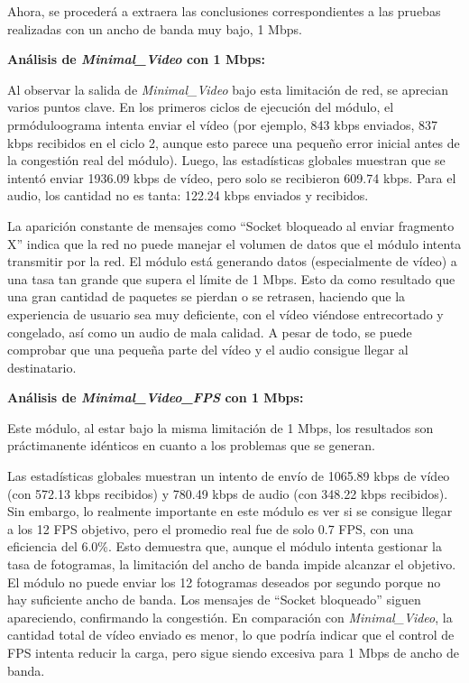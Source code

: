 \newpage

Ahora, se procederá a extraera las conclusiones correspondientes a las pruebas realizadas con un ancho de banda muy bajo, 1 Mbps.

\vspace{\baselineskip}

\textbf{Análisis de \textit{Minimal\_Video} con 1 Mbps:}
\vspace{\baselineskip}

Al observar la salida de \textit{Minimal\_Video} bajo esta limitación de red, se aprecian varios puntos clave. En los primeros ciclos de ejecución del módulo, el prmóduloograma intenta enviar el vídeo (por ejemplo, 843 kbps enviados, 837 kbps recibidos en el ciclo 2, aunque esto parece una pequeño error inicial antes de la congestión real del módulo). Luego, las estadísticas globales muestran que se intentó enviar 1936.09 kbps de vídeo, pero solo se recibieron 609.74 kbps. Para el audio, los cantidad no es tanta: 122.24 kbps enviados y recibidos.
\vspace{\baselineskip}

La aparición constante de mensajes como ``Socket bloqueado al enviar fragmento X'' indica que la red no puede manejar el volumen de datos que el módulo intenta transmitir por la red. El módulo está generando datos (especialmente de vídeo) a una tasa tan grande que supera el límite de 1 Mbps. Esto da como resultado que una gran cantidad de paquetes se pierdan o se retrasen, haciendo que la experiencia de usuario sea muy deficiente, con el vídeo viéndose entrecortado y congelado, así como un audio de mala calidad. A pesar de todo, se puede comprobar que una pequeña parte del vídeo y el audio consigue llegar al destinatario.

\vspace{\baselineskip}

\textbf{Análisis de \textit{Minimal\_Video\_FPS} con 1 Mbps:}
\vspace{\baselineskip}

Este módulo, al estar bajo la misma limitación de 1 Mbps, los resultados son práctimanente idénticos en cuanto a los problemas que se generan. 
\vspace{\baselineskip}

Las estadísticas globales muestran un intento de envío de 1065.89 kbps de vídeo (con 572.13 kbps recibidos) y 780.49 kbps de audio (con 348.22 kbps recibidos). Sin embargo, lo realmente importante en este módulo es ver si se consigue llegar a los 12 FPS objetivo, pero el promedio real fue de solo 0.7 FPS, con una eficiencia del 6.0\%. Esto demuestra que, aunque el módulo intenta gestionar la tasa de fotogramas, la limitación del ancho de banda impide alcanzar el objetivo. El módulo no puede enviar los 12 fotogramas deseados por segundo porque no hay suficiente ancho de banda. Los mensajes de ``Socket bloqueado'' siguen apareciendo, confirmando la congestión. En comparación con \textit{Minimal\_Video}, la cantidad total de vídeo enviado es menor, lo que podría indicar que el control de FPS intenta reducir la carga, pero sigue siendo excesiva para 1 Mbps de ancho de banda.

